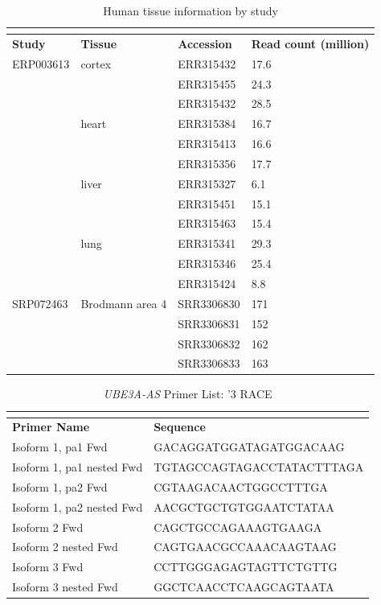\begin{longtabu} {X[1,c]X[1.5,c]X[1,c]X[1.5,c]}
  \caption{Human tissue information by study}\\
  \label{tableB:2}\\
  \toprule
  \textbf{Study} & \textbf{Tissue} & \textbf{Accession} & \textbf{Read count (million)}\\
  \midrule
  \endhead
  ERP003613 & cortex          & ERR315432  & 17.6\\
            &                 & ERR315455  & 24.3\\
            &                 & ERR315432  & 28.5\\
            & heart           & ERR315384  & 16.7\\
            &                 & ERR315413  & 16.6\\
            &                 & ERR315356  & 17.7\\
            & liver           & ERR315327  & 6.1 \\
            &                 & ERR315451  & 15.1\\
            &                 & ERR315463  & 15.4\\
            & lung            & ERR315341  & 29.3\\
            &                 & ERR315346  & 25.4\\
            &                 & ERR315424  & 8.8 \\
  \midrule
  SRP072463 & Brodmann area 4 & SRR3306830 & 171 \\
            &                 & SRR3306831 & 152 \\
            &                 & SRR3306832 & 162 \\
            &                 & SRR3306833 & 163 \\
  \bottomrule
\end{longtabu}
\pagebreak
\begin{longtabu} to \textwidth {X[2,l]X[3,l]}
  \caption{\emph{UBE3A-AS} Primer List: '3 RACE}\\
  \label{human primers}\\
  \toprule
  \bfseries Primer Name & \textbf{Sequence}\\
  \midrule
  \endhead
  Isoform 1, pa1 Fwd        & GACAGGATGGATAGATGGACAAG\\
  Isoform 1, pa1 nested Fwd & TGTAGCCAGTAGACCTATACTTTAGA\\
  Isoform 1, pa2 Fwd        & CGTAAGACAACTGGCCTTTGA\\
  Isoform 1, pa2 nested Fwd & AACGCTGCTGTGGAATCTATAA\\
  Isoform 2 Fwd             & CAGCTGCCAGAAAGTGAAGA\\
  Isoform 2 nested Fwd      & CAGTGAACGCCAAACAAGTAAG\\
  Isoform 3 Fwd             & CCTTGGGAGAGTAGTTCTGTTG\\
  Isoform 3 nested Fwd      & GGCTCAACCTCAAGCAGTAATA\\
  \bottomrule
\end{longtabu}
